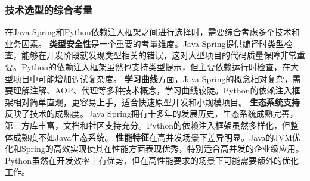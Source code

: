 \subsubsection{技术选型的综合考量}\label{ux6280ux672fux9009ux578bux7684ux7efcux5408ux8003ux91cf} 在Java
Spring和Python依赖注入框架之间进行选择时，需要综合考虑多个技术和业务因素。 \textbf{类型安全性}是一个重要的考量维度。Java
Spring提供编译时类型检查，能够在开发阶段就发现类型相关的错误，这对大型项目的代码质量保障非常重要。Python的依赖注入框架虽然也支持类型提示，但主要依赖运行时检查，在大型项目中可能增加调试复杂度。
\textbf{学习曲线}方面，Java Spring的概念相对复杂，需要理解注解、AOP、代理等多种技术概念，学习曲线较陡。Python的依赖注入框架相对简单直观，更容易上手，适合快速原型开发和小规模项目。
\textbf{生态系统支持}反映了技术的成熟度。Java Spring拥有十多年的发展历史，生态系统成熟完善，第三方库丰富，文档和社区支持充分。Python的依赖注入框架虽然多样化，但整体成熟度不如Java生态系统。
\textbf{性能特征}在高并发场景下差异明显。Java的JVM优化和Spring的高效实现使其在性能方面表现优秀，特别适合高并发的企业级应用。Python虽然在开发效率上有优势，但在高性能要求的场景下可能需要额外的优化工作。

